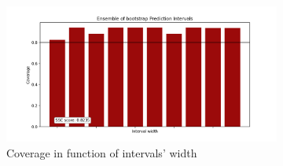 \begin{figure}[ht]
    \hfill
    \begin{subfigure}[b]{0.32\textwidth}
        \centering
        \includegraphics[width=1.15\textwidth, height=0.85\textwidth]{Figures/timeseries/without-change-point/coverage-vs-width-timeseries-problem.png}
        \caption{Coverage in function of intervals' width}
        \label{subfig:app-timeseries-coverage-width}
    \end{subfigure}
    \hfill %
    \begin{subfigure}[b]{0.32\textwidth} %
        \centering

\end{subfigure}
\end{figure}
